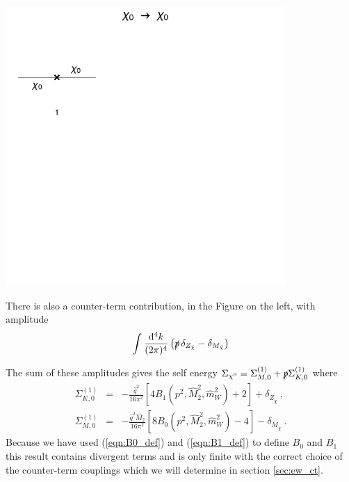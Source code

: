 \documentclass[11pt]{article}
\def\cn{\chi^0}
\renewcommand{\d}{\ensuremath{\operatorname{d}\!}}
\begin{document}
\noindent\begin{minipage}{0.3\textwidth}
\includegraphics[width=0.8\textwidth]{1loop_1c.pdf}
\end{minipage}
\noindent\begin{minipage}{0.7\textwidth}
There is also a counter-term contribution, in the Figure on the left, with amplitude
\begin{align}
 \int \frac{\d^4k}{(2\pi)^4}\left(\slashed{p}\,\delta_{Z_{\tilde{\chi}}}-\delta_{M_{\tilde{\chi}}}\right)
 \end{align}
 \end{minipage}
\vspace{0.3cm}

The sum of these amplitudes gives the self energy $\Sigma_{\cn}= \Sigma_{M, 0}^{(1)}+\slashed{p}\Sigma_{K, 0}^{(1)}$ where
\begin{eqnarray}
\Sigma_{K, 0}^{(1)} &=&
-\frac{\hat{g}^2}{16\pi^2}
\left[ 4 B_1(p^2, \hat{M}_2^2, \hat{m}_W^2) + 2 \right]
+\delta_{Z_{\tilde{\chi}}}\ , \label{eq: Neu_K} \\
\Sigma_{M, 0}^{(1)} &=&
-\frac{\hat{g}^2 \hat{M}_2}{16\pi^2}
\left[ 8 B_0(p^2, \hat{M}_2^2, \hat{m}_W^2) - 4 \right]
-\delta_{M_{\tilde{\chi}}}\ . \label{eq: Neu_M}
\end{eqnarray}
Because we have used (\ref{eqn:B0_def}) and (\ref{eqn:B1_def}) to define $B_0$ and $B_1$ this result contains divergent terms and is only finite with the correct choice of the counter-term couplings which we will determine in section \ref{sec:ew_ct}.
\end{document}
